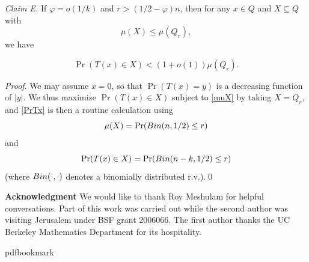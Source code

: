 \documentclass[11pt]{article}
\numberwithin{equation}{section}
\theoremstyle{definition}
\theoremstyle{plain}
\newcommand{\beq}[1]{\begin{equation}\label{#1}}
\newcommand{\enq}[0]{\end{equation}}
\newcommand{\mn}[0]{\medskip\noindent}
\newcommand{\sub}[0]{\subseteq}
\newcommand{\0}[0]{\emptyset}
\newcommand{\vp}[0]{\varphi}
\def\vp{\varphi}
\def\vp{\varphi}
\begin{document}
\mn
\emph{Claim E.}
If $\vp =o(1/k)$ and $r > (1/2-\vp)n$, then for any $x\in Q$ and
$X\sub Q$ with
\beq{muX}
\mu(X) \leq \mu(Q_r),
\enq
we have

\beq{PrTx}
\Pr(T(x)\in X) < (1+o(1))\mu(Q_r).
\enq

\mn
\emph{Proof}.
We may assume $x=\underline{0}$, so that $\Pr(T(x)=y)$ is a decreasing
function of $|y|$.
We thus maximize $\Pr(T(x)\in X)$
subject to \eqref{muX} by taking
$
X=Q_r,
$
and \eqref{PrTx} is then a routine calculation
using
$$\mu(X) =\Pr({\rm Bin}(n,1/2)\leq r)$$
and
$$\Pr(T(x)\in X) =\Pr({\rm Bin}(n-k,1/2)\leq r)$$
(where ${\rm Bin}(\cdot,\cdot)$ denotes a binomially
distributed r.v.).\qed


\mn
{\bf Acknowledgment}
We would like to thank Roy Meshulam for helpful conversations.
Part of this work was carried out while the second author
was visiting Jerusalem
under BSF grant 2006066.
The first author
%
%
thanks the UC Berkeley %
Mathematics Department  %
for its hospitality.

%

\newcommand{\prelim}{Preliminary version in\ }\newcommand{\prelims}{Preliminary
  versions in\ }
\providecommand{\bibhead}[1]{}
\expandafter\ifx\csname pdfbookmark\endcsname\relax%
  \providecommand{\tocrefpdfbookmark}{}
\else\providecommand{\tocrefpdfbookmark}{%
   \hypertarget{tocreferences}{}%
   \pdfbookmark[1]{References}{tocreferences}}%
\fi
\end{document}
